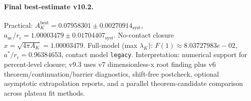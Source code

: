 \paragraph{Final best-estimate v10.2.}
Practical: $A_K^{\mathrm{best}} = 0.07958301 \pm 0.00270914_{\mathrm{syst}}$, $a_{\mathrm{nc}}/r_c = 1.00003479 \pm 0.01704407_{\mathrm{syst}}$.
No-contact closure $x = \sqrt{4\pi A_K} = 1.00003479$.
Full-model (max $\lambda_K$): $F(1) \approx 8.03727983e-02$, $a^*/r_c = 0.96384653$, contact model \texttt{legacy}.
Interpretation: numerical support for percent-level closure; v9.3 uses v7 dimensionless-x root finding plus v6 theorem/continuation/barrier diagnostics, shift-free postcheck, optional asymptotic extrapolation reports, and a parallel theorem-candidate comparison across plateau fit methods.
